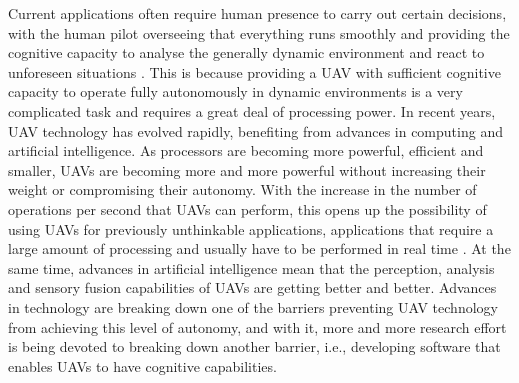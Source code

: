 Current applications often require human presence to carry out certain decisions, with the human pilot overseeing that everything runs smoothly and providing the cognitive capacity to analyse the generally dynamic environment and react to unforeseen situations \cite{sebbane2015smart, MITfullyAutonomous,kopeikin2012flight}. This is because providing a \gls{UAV} with sufficient cognitive capacity to operate fully autonomously in dynamic environments is a very complicated task and requires a great deal of processing power. In recent years, \gls{UAV} technology has evolved rapidly, benefiting from advances in computing and artificial intelligence. As processors are becoming more powerful, efficient and smaller, \glspl{UAV} are becoming more and more powerful without increasing their weight or compromising their autonomy. With the increase in the number of operations per second that \glspl{UAV} can perform, this opens up the possibility of using \glspl{UAV} for previously unthinkable applications, applications that require a large amount of processing and usually have to be performed in real time \cite{CivilAplications, shakeri2019design}. At the same time, advances in artificial intelligence mean that the perception, analysis and sensory fusion capabilities of \glspl{UAV} are getting better and better. Advances in technology are breaking down one of the barriers preventing \gls{UAV} technology from achieving this level of autonomy, and with it, more and more research effort is being devoted to breaking down another barrier, i.e., developing software that enables \glspl{UAV} to have cognitive capabilities.

